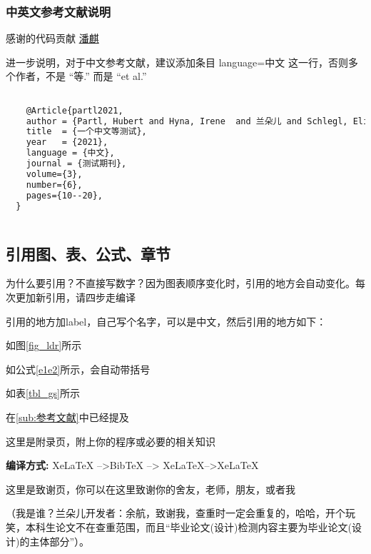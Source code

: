 \documentclass[AutoFakeBold]{LZUThesis}
\begin{document}
\subsubsection{中英文参考文献说明} %

感谢的代码贡献
\href{https://gitee.com/versemonger}{潘麒}

进一步说明，对于中文参考文献，建议添加条目 language={中文} 这一行，否则多个作者，不是 “等.”\cite{partl2021} 而是 “et al.”\cite{partl2016}
\begin{lstlisting}[language = tex]

    @Article{partl2021,
    author = {Partl, Hubert and Hyna, Irene  and 兰朵儿 and Schlegl, Elisabeth},
    title  = {一个中文等测试},
    year   = {2021},
    language = {中文},
    journal = {测试期刊},
    volume={3},
    number={6},
    pages={10--20},
  }
  
\end{lstlisting}




\subsection{引用图、表、公式、章节} %

为什么要引用？不直接写数字？因为图表顺序变化时，引用的地方会自动变化。每次更加新引用，请四步走编译

引用的地方加label，自己写个名字，可以是中文，然后引用的地方如下：

如图\ref{fig_ldr}所示

如公式\eqref{e1e2}所示，会自动带括号

如表\ref{tbl_gs}所示

在\ref{sub:参考文献}中已经提及


\backmatter


\printbib



\Appendix


这里是附录页，附上你的程序或必要的相关知识

{\bfseries 编译方式:} XeLaTeX -->BibTeX --> XeLaTeX-->XeLaTeX


\Thanks

这里是致谢页，你可以在这里致谢你的舍友，老师，朋友，或者我

（我是谁？兰朵儿开发者：余航，致谢我，查重时一定会重复的，哈哈，开个玩笑，本科生论文不在查重范围，而且“毕业论文(设计)检测内容主要为毕业论文(设计)的主体部分”）。


\Grade %
\end{document}
